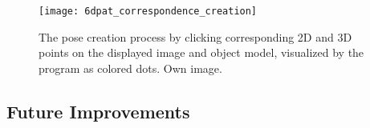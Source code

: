 \begin{figure}[!tbp]
	\centering
    \texttt{[image: 6dpat\_correspondence\_creation]}
    \caption{The pose creation process by clicking corresponding 2D and 3D points on the displayed image and object model, visualized by the program as colored dots. Own image.}
    \label{fig:6dpat_correspondence_creation}
\end{figure} 



\subsection{Future Improvements}





